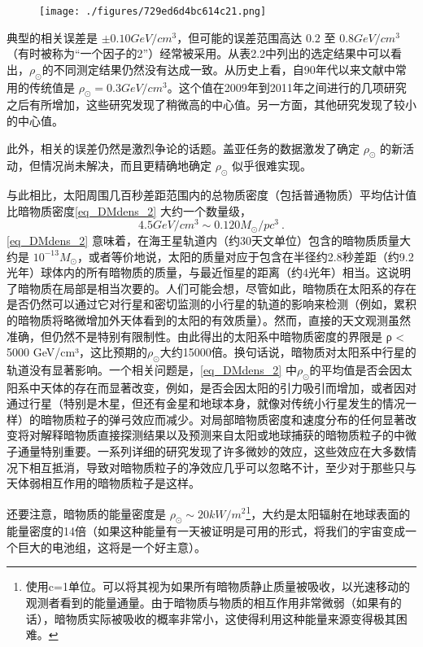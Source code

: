 \begin{figure}[ht]
\centering
\texttt{[image: ./figures/729ed6d4bc614c21.png]}
\caption{} \label{fig_DMdens_3}
\end{figure}

典型的相关误差是 $\pm 0.10 GeV/cm^3$，但可能的误差范围高达 $0.2$ 至 $0.8 GeV/cm^3$（有时被称为“一个因子的2”）经常被采用。从表2.2中列出的选定结果中可以看出，$\rho_\odot$的不同测定结果仍然没有达成一致。从历史上看，自90年代以来文献中常用的传统值是 $\rho_\odot = 0.3 GeV/cm^3$。这个值在2009年到2011年之间进行的几项研究之后有所增加，这些研究发现了稍微高的中心值。另一方面，其他研究发现了较小的中心值。

此外，相关的误差仍然是激烈争论的话题。盖亚任务的数据激发了确定 $\rho_\odot$ 的新活动，但情况尚未解决，而且更精确地确定 $\rho_\odot$ 似乎很难实现。

与此相比，太阳周围几百秒差距范围内的总物质密度（包括普通物质）平均估计值比暗物质密度\autoref{eq_DMdens_2} 大约一个数量级，
\begin{equation}
4.5 GeV/cm^3 \sim 0.120 M_\odot/pc^3~.
\end{equation}
\autoref{eq_DMdens_2} 意味着，在海王星轨道内（约30天文单位）包含的暗物质质量大约是 \(10^{-13} M_\odot\)，或者等价地说，太阳的质量对应于包含在半径约2.8秒差距（约9.2光年）球体内的所有暗物质的质量，与最近恒星的距离（约4光年）相当。这说明了暗物质在局部是相当次要的。人们可能会想，尽管如此，暗物质在太阳系的存在是否仍然可以通过它对行星和密切监测的小行星的轨道的影响来检测（例如，累积的暗物质将略微增加外天体看到的太阳的有效质量）。然而，直接的天文观测虽然准确，但仍然不是特别有限制性。由此得出的太阳系中暗物质密度的界限是 ρ < 5000 GeV/cm³，这比预期的$\rho_\odot$大约15000倍。换句话说，暗物质对太阳系中行星的轨道没有显著影响。一个相关问题是，\autoref{eq_DMdens_2} 中$\rho_\odot$的平均值是否会因太阳系中天体的存在而显著改变，例如，是否会因太阳的引力吸引而增加，或者因对通过行星（特别是木星，但还有金星和地球本身，就像对传统小行星发生的情况一样）的暗物质粒子的弹弓效应而减少。对局部暗物质密度和速度分布的任何显著改变将对解释暗物质直接探测结果以及预测来自太阳或地球捕获的暗物质粒子的中微子通量特别重要。一系列详细的研究发现了许多微妙的效应，这些效应在大多数情况下相互抵消，导致对暗物质粒子的净效应几乎可以忽略不计，至少对于那些只与天体弱相互作用的暗物质粒子是这样。

还要注意，暗物质的能量密度是 $\rho_\odot \sim 20 kW/m^2$\footnote{使用c=1单位。可以将其视为如果所有暗物质静止质量被吸收，以光速移动的观测者看到的能量通量。由于暗物质与物质的相互作用非常微弱（如果有的话），暗物质实际被吸收的概率非常小，这使得利用这种能量来源变得极其困难。}，大约是太阳辐射在地球表面的能量密度的14倍（如果这种能量有一天被证明是可用的形式，将我们的宇宙变成一个巨大的电池组，这将是一个好主意）。

